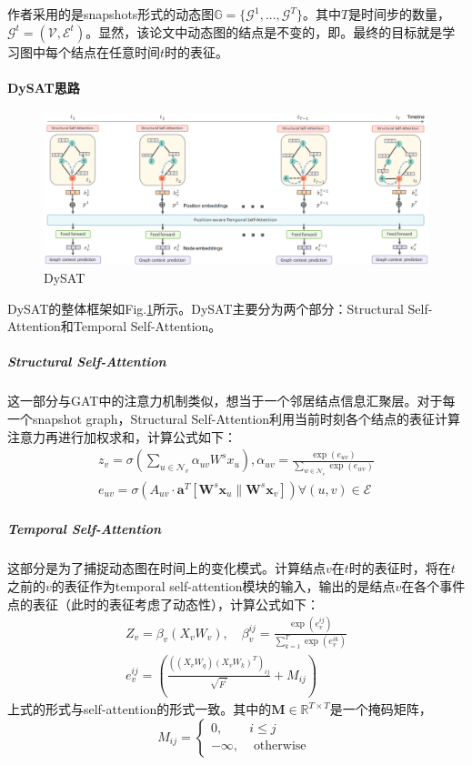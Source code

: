 作者采用的是snapshots形式的动态图$\mathbb{G} = \{\mathcal{G}^1, ..., \mathcal{G}^T\}$。其中$T$是时间步的数量，$\mathcal{G}^t = (\mathcal{V}, \mathcal{E}^t)$。显然，该论文中动态图的结点是不变的，即。最终的目标就是学习图中每个结点在任意时间$t$时的表征。

\paragraph{DySAT思路}
\begin{figure}[h]
	\centering
	\includegraphics[width=.8\textwidth]{pics/DySAT.png}
	\caption{DySAT}
	\label{fig:dysat}
\end{figure}
DySAT的整体框架如Fig.\ref{fig:dysat}所示。DySAT主要分为两个部分：Structural Self-Attention和Temporal Self-Attention。

\subparagraph{Structural Self-Attention}
这一部分与GAT中的注意力机制类似，想当于一个邻居结点信息汇聚层。对于每一个snapshot graph，Structural Self-Attention利用当前时刻各个结点的表征计算注意力再进行加权求和，计算公式如下：
$$
\begin{array}{c}
	z_{v}=\sigma\left(\sum_{u \in \mathcal{N}_{v}} \alpha_{u v} W^{s} x_{u}\right), \alpha_{u v}=\frac{\exp \left(e_{u v}\right)}{\sum_{w \in \mathcal{N}_{v}} \exp \left(e_{w v}\right)} \\
	e_{u v}=\sigma\left(A_{u v} \cdot \boldsymbol{a}^{T}\left[\boldsymbol{W}^{s} \boldsymbol{x}_{u} \| \boldsymbol{W}^{s} \boldsymbol{x}_{v}\right]\right) \forall(u, v) \in \mathcal{E}
\end{array}
$$

\subparagraph{Temporal Self-Attention}
这部分是为了捕捉动态图在时间上的变化模式。计算结点$v$在$t$时的表征时，将在$t$之前的$v$的表征作为temporal self-attention模块的输入，输出的是结点$v$在各个事件点的表征（此时的表征考虑了动态性），计算公式如下：
$$
\begin{array}{r}
	Z_{v}=\beta_{v}\left(X_{v} W_{v}\right), \quad \beta_{v}^{i j}=\frac{\exp \left(e_{v}^{i j}\right)}{\sum_{k=1}^{T} \exp \left(e_{v}^{i k}\right)} \\
	e_{v}^{i j}=\left(\frac{\left(\left(X_{v} W_{q}\right)\left(X_{v} W_{k}\right)^{T}\right)_{i j}}{\sqrt{F^{\prime}}}+M_{i j}\right)
\end{array}
$$
上式的形式与self-attention的形式一致。其中的$\mathbf{M} \in \mathbb{R}^{T \times T}$是一个掩码矩阵，
$$
M_{i j}=\left\{\begin{array}{ll}
	0, & i \leq j \\
	-\infty, & \text { otherwise }
\end{array}\right.
$$

